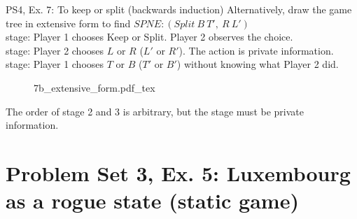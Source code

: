 \begin{frame}{PS4, Ex. 7: To keep or split (backwards induction)}
  Alternatively, draw the game tree in extensive form to find $SPNE:(Split\ B\ T',\ R\ L')$\\\medskip
   stage: Player 1 chooses Keep or Split. Player 2 observes the choice.\\\medskip
   stage: Player 2 chooses $L$ or $R$ ($L'$ or $R'$). The action is private information.\\\medskip
   stage: Player 1 chooses $T$ or $B$ ($T'$ or $B'$) without knowing what Player 2 did.\\\medskip
  \begin{figure}[!h]
    \center
    \def\svgwidth{\columnwidth}
    {7b_extensive_form.pdf_tex}

  \end{figure}
  \vspace{-8pt}
  The order of stage 2 and 3 is arbitrary, but the  stage must be private information.
\end{frame}


\section{Problem Set 3, Ex. 5: Luxembourg as a rogue state (static game)}


